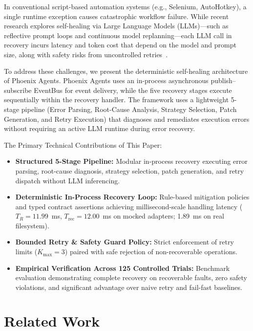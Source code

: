 \documentclass[conference]{IEEEtran}
\newcommand{\chg}[1]{{\color{blue}#1}}
\begin{document}
In conventional script-based automation systems (e.g., Selenium, AutoHotkey), a single runtime exception causes catastrophic workflow failure. While recent research explores self-healing via Large Language Models (LLMs)---such as reflective prompt loops and continuous model replanning---each LLM call in recovery incurs latency and token cost that depend on the model and prompt size, along with safety risks from uncontrolled retries~\cite{babu2026,jeong2026}.

To address these challenges, we present the deterministic self-healing architecture of Phoenix Agents. Phoenix Agents uses an in-process asynchronous publish--subscribe EventBus for event delivery, while the five recovery stages execute sequentially within the recovery handler. The framework uses a lightweight 5-stage pipeline (Error Parsing, Root-Cause Analysis, Strategy Selection, Patch Generation, and Retry Execution) that diagnoses and remediates execution errors without requiring an active LLM runtime during error recovery.

The Primary Technical Contributions of This Paper:
\begin{itemize}
    \item \textbf{Structured 5-Stage Pipeline:} Modular in-process recovery executing error parsing, root-cause diagnosis, strategy selection, patch generation, and retry dispatch without LLM inferencing.
    \item \textbf{Deterministic In-Process Recovery Loop:} Rule-based mitigation policies and typed contract assertions achieving millisecond-scale handling latency \chg{($T_R = 11.99$~ms, $T_{\text{rec}} = 12.00$~ms on mocked adapters; 1.89~ms on real filesystem)}.
    \item \textbf{Bounded Retry \& Safety Guard Policy:} Strict enforcement of retry limits ($K_{\text{max}} = 3$) paired with safe rejection of non-recoverable operations.
    \item \chg{\textbf{Empirical Verification Across 125 Controlled Trials:} Benchmark evaluation demonstrating complete recovery on recoverable faults, zero safety violations, and significant advantage over naive retry and fail-fast baselines.}
\end{itemize}

\section{Related Work}
\end{document}
